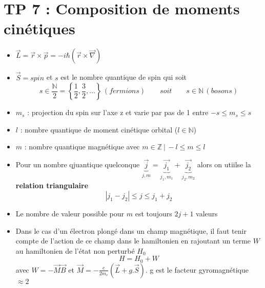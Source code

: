 
\section*{TP 7 : Composition de moments cinétiques}
\begin{itemize}
	\item $\vec{L} = \vec{r}\times \vec{p} = -i\hbar (\vec{r}\times \vec{\nabla})$
	
	\item $\vec{S} = spin$ et $s$ est le nombre quantique de spin qui soit 
	\begin{equation}
		s \in \frac{\mathbb{N}}{2} = \left\{ \frac{1}{2}, \frac{3}{2},\dots \right\} \, (fermions) \qquad soit \qquad s \in \mathbb{N} \, (bosons)
	\end{equation}
	\item $m_s$ : projection du spin sur l'axe z et varie par pas de 1 entre $-s \leq m_s \leq s$
	
	\item $l$ : nombre quantique de moment cinétique orbital ($l \in \mathbb{N}$)
	
	\item $m$ : nombre quantique magnétique avec $m \in \mathbb{Z} \ |\, -l \leq m \leq l$
	
	\item Pour un nombre qjuantique quelconque $\underbrace{\vec{j}}_{j,m} = \underbrace{\vec{j_1}}_{j_1,m_1}+\underbrace{\vec{j_2}}_{j_2,m_2}$ alors on utiilse la \textbf{relation triangulaire} 
	\begin{equation}
	|j_1 -j_2| \leq j \leq j_1+j_2
	\end{equation}
	
	\item Le nombre de valeur possible pour $m$ est toujours $2 j +1$ valeurs
	
	\item Dans le cas d'un électron plongé dans un champ magnétique, il faut tenir compte de l'action de ce champ dans le hamiltonien en rajoutant un terme $W$ au hamiltonien de l'état non perturbé $H_0$
	\begin{equation}
		H = H_0 + W
	\end{equation}
	avec $W = -\vec{M}\vec{B}$ et $\vec{M} = -\frac{e}{2m_e}(\vec{L}+g.\vec{S})$. g est le facteur gyromagnétique $\approx 2$
\end{itemize}